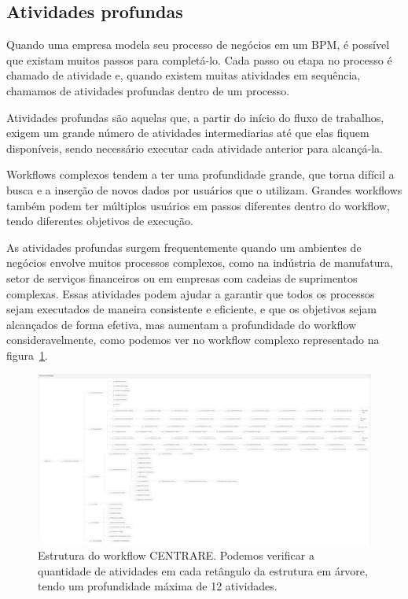 \subsection{Atividades profundas}


Quando uma empresa modela seu processo de negócios em um BPM, é possível que existam muitos passos para completá-lo. Cada passo ou etapa no processo é chamado de atividade e, quando existem muitas atividades em sequência, chamamos de atividades profundas dentro de um processo.

Atividades profundas são aquelas que, a partir do início do fluxo de trabalhos, exigem um grande número de atividades intermediarias até que elas fiquem disponíveis, sendo necessário executar cada atividade anterior para alcançá-la.


Workflows complexos tendem a ter uma profundidade grande, que torna difícil a busca e a inserção de novos dados por usuários que o utilizam. Grandes workflows também podem ter múltiplos usuários em passos diferentes dentro do workflow, tendo diferentes objetivos de execução.

As atividades profundas surgem frequentemente quando um ambientes de negócios envolve muitos processos complexos, como na indústria de manufatura, setor de serviços financeiros ou em empresas com cadeias de suprimentos complexas. Essas atividades podem ajudar a garantir que todos os processos sejam executados de maneira consistente e eficiente, e que os objetivos sejam alcançados de forma efetiva, mas aumentam a profundidade do workflow consideravelmente, como podemos ver no workflow complexo representado na figura~\ref{fig:centrareEstrutura}.

\begin{figure}
    \centering
    \includegraphics[width=1\textwidth]{imgs/CENTRARE/estrutura.png}
    \caption{Estrutura do workflow CENTRARE. Podemos verificar a quantidade de atividades em cada retângulo da estrutura em árvore, tendo um profundidade máxima de 12 atividades.}
    \label{fig:centrareEstrutura}
\end{figure}

